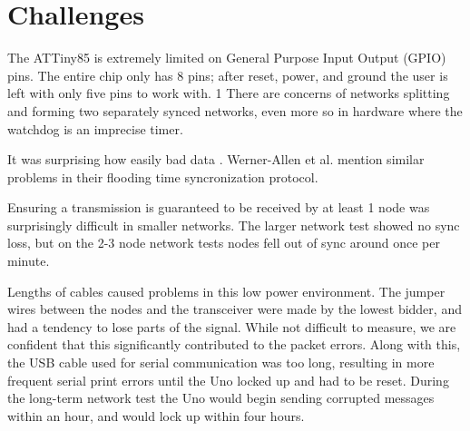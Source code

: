 \section{Challenges}
\label{section:challenges}

The ATTiny85 is extremely limited on General Purpose Input Output (GPIO) pins. The entire chip only has 8 pins; after reset, power, and ground the user is left with only five pins to work with. 1
There are concerns of networks splitting and forming two separately synced networks, even more so in hardware where the watchdog is an imprecise timer. 

It was surprising how easily bad data . Werner-Allen et al. mention similar problems in their flooding time syncronization protocol. 

Ensuring a transmission is guaranteed to be received by at least 1 node was surprisingly difficult in smaller networks. The larger network test showed no sync loss, but on the 2-3 node network tests nodes fell out of sync around once per minute.

Lengths of cables caused problems in this low power environment. The jumper wires between the nodes and the transceiver were made by the lowest bidder, and had a tendency to lose parts of the signal. While not difficult to measure, we are confident that this significantly contributed to the packet errors. Along with this, the USB cable used for serial communication was too long, resulting in more frequent serial print errors until the Uno locked up and had to be reset. During the long-term network test the Uno would begin sending corrupted messages within an hour, and would lock up within four hours.
